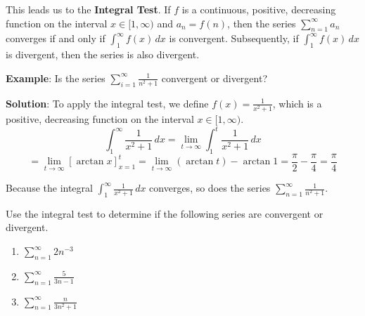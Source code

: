 This leads us to the \textbf{Integral Test}. If $f$ is a continuous, positive, 
decreasing function on the interval $x \in [1, \infty)$ and $a_n = f(n)$, then 
the series $\sum_{n=1}^\infty a_n$ converges if and only if $\int_1^\infty 
f(x)\,dx$ is convergent. Subsequently, if $\int_1^\infty f(x)\,dx$ is 
divergent, then the series is also divergent.

\textbf{Example}: Is the series $\sum_{i = 1}^\infty \frac{1}{n^2 + 1}$ 
convergent or divergent?

\textbf{Solution}: To apply the integral test, we define $f(x) = 
\frac{1}{x^2 + 1}$, which is a positive, decreasing function on the interval 
$x \in [1, \infty)$. 
$$\int_1^\infty \frac{1}{x^2 + 1}\,dx = \lim_{t \to \infty} \int_{1}^t 
\frac{1}{x^2 + 1}\,dx$$
$$= \lim_{t \to \infty} \left[ \arctan{x} \right]_{x = 1}^t = \lim_{t \to \infty} 
\left( \arctan{t} \right) - \arctan{1} = \frac{\pi}{2} - \frac{\pi}{4} = 
\frac{\pi}{4}$$

Because the integral $\int_1^\infty \frac{1}{x^2 + 1}\,dx$ converges, so does 
the series $\sum_{n = 1}^\infty \frac{1}{n^2 + 1}$. 

\begin{Exercise}[label = series1]
Use the integral test to determine if the following series are convergent or 
divergent. 
\begin{enumerate}
\item $\sum_{n = 1}^\infty 2n^{-3}$
\item $\sum_{n = 1}^\infty \frac{5}{3n-1}$
\item $\sum_{n = 1}^\infty \frac{n}{3n^2 + 1}$
\end{enumerate}
\vspace{40mm}
\end{Exercise}

